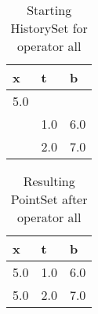 \begin{table}[!hbtp]
  \caption{Starting HistorySet for operator all}
  \label{operator_all_switch_before}
\begin{tabular}{l|l|l}
  x & t & b \\
  \hline
  5.0 &  &  \\
  \hline
  & 1.0 & 6.0 \\
  \hline
  & 2.0 & 7.0 \\
\end{tabular}
\end{table}

\begin{table}[!hbtp]
  \caption{Resulting PointSet after operator all}
  \label{operator_all_switch_after}
\begin{tabular}{l|l|l}
  x & t & b \\
  \hline
  5.0 & 1.0 & 6.0  \\
  \hline
  5.0 & 2.0 & 7.0 \\
\end{tabular}
\end{table}
